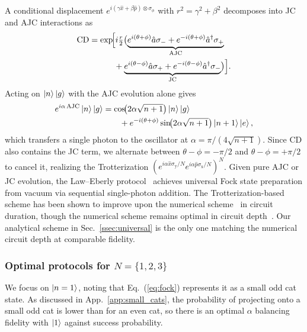 \documentclass[aps,prx,showpacs,notitlepage,twocolumn,superscriptaddress,nofootinbib,preprintnumbers,floatfix,10pt, longbibliography]{revtex4-2}
\begin{document}
{A conditional displacement $e^{i(\gamma\hat{x}+\beta\hat{p})\otimes\sigma_\phi}$
with $r^2=\gamma^2+\beta^2$ decomposes into JC and AJC interactions as
\begin{align}
  \mathrm{CD} &= \exp\!\Bigl[i\tfrac{r}{2}\bigl(
    \underbrace{e^{i(\theta+\phi)}\hat{a}\sigma_- +
                e^{-i(\theta+\phi)}\hat{a}^\dagger\sigma_+}_\text{AJC}
   \nonumber\\&\quad\quad\quad+\underbrace{e^{i(\theta-\phi)}\hat{a}\sigma_+ +
                e^{-i(\theta-\phi)}\hat{a}^\dagger\sigma_-}_\text{JC}
    \bigr)\Bigr].
\end{align}
Acting on $\ket{n}\ket{g}$ with the AJC evolution alone gives
\begin{align}
  e^{i\alpha\,\mathrm{AJC}}\ket{n}\ket{g}
  &= \cos\!\bigl(2\alpha\sqrt{n+1}\bigr)\ket{n}\ket{g}
    \nonumber\\&\quad\quad+e^{-i(\theta+\phi)}\sin\!\bigl(2\alpha\sqrt{n+1}\bigr)
     \ket{n+1}\ket{e},
  \label{eq:law-eberly}
\end{align}
which transfers a single photon to the oscillator at
$\alpha=\pi/(4\sqrt{n+1})$.  Since $\mathrm{CD}$ also contains the JC
term, we alternate between $\theta-\phi=-\pi/2$ and $\theta-\phi=+\pi/2$
to cancel it, realizing the Trotterization
$(e^{i\alpha\hat{x}\sigma_\mathrm{y}/N}e^{i\alpha\hat{p}\sigma_\mathrm{x}/N})^N$.
Given pure AJC or JC evolution, the Law--Eberly
protocol~\cite{law1996arbitrary} achieves universal Fock state preparation
from vacuum via sequential single-photon addition.  The Trotterization-based
scheme has been shown to improve upon the numerical scheme~\cite{eickbusch2022fast}
in circuit duration, though the numerical scheme remains optimal in circuit
depth~\cite{ISA}.  Our analytical scheme in Sec.~\ref{ssec:universal} is
the only one matching the numerical circuit depth at comparable fidelity.

\subsubsection{Optimal protocols for $N=\{1,2,3\}$}\label{app:fock_circuit}

We focus on $\ket{n=1}$, noting that Eq.~(\ref{eq:fock}) represents it as
a small odd cat state.  As discussed in App.~\ref{app:small_cats}, the
probability of projecting onto a small odd cat is lower than for an even
cat, so there is an optimal $\alpha$ balancing fidelity with $\ket{1}$
against success probability.

}
\end{document}
